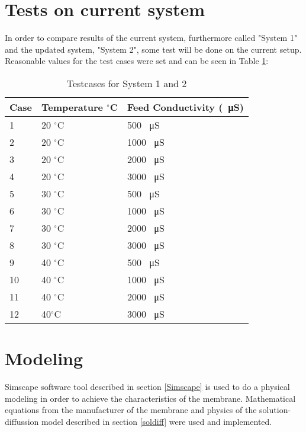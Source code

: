 \section{Tests on current system}
In order to compare results of the current system, furthermore called "System 1" and the updated system, "System 2", some test will be done on the current setup. Reasonable values for the test cases were set and can be seen in Table \ref{tab:testcases}:\\
\begin{table}[h]
\begin{tabular}{ |p{1cm}||p{3cm}|p{4cm}|}
 \hline
 \textbf{Case}&Temperature $^\circ$C& Feed Conductivity (\SI{}{\micro\siemens}) \\
 \hline
 1   &   20 $^\circ$C  & 500 \SI{}{\micro\siemens}  \\
 2 &  20 $^\circ$C & 1000 \SI{}{\micro\siemens}  \\
 3 &20 $^\circ$C& 2000 \SI{}{\micro\siemens}\\
 4   &20 $^\circ$C& 3000 \SI{}{\micro\siemens}\\
 \hline
 5 & 30 $^\circ$C & 500 \SI{}{\micro\siemens}\\
 6 & 30 $^\circ$C& 1000 \SI{}{\micro\siemens}\\
 7 & 30 $^\circ$C& 2000 \SI{}{\micro\siemens}\\
 8 & 30 $^\circ$C& 3000 \SI{}{\micro\siemens}\\
 \hline
 9 & 40 $^\circ$C& 500 \SI{}{\micro\siemens}\\
 10 & 40 $^\circ$C & 1000 \SI{}{\micro\siemens}\\
 11 & 40 $^\circ$C& 2000 \SI{}{\micro\siemens}\\
 12 & 40$^\circ$C & 3000 \SI{}{\micro\siemens}\\
\hline
\end{tabular}
\caption{Testcases for System 1 and 2}
    \label{tab:testcases} 
\end{table}


\section{Modeling}
Simscape software tool described in section \ref{Simscape} is used to do a physical modeling in order to achieve the characteristics of the membrane. Mathematical equations from the manufacturer of the membrane and physics of the solution-diffussion model described in section \ref{soldiff} were used and implemented.

